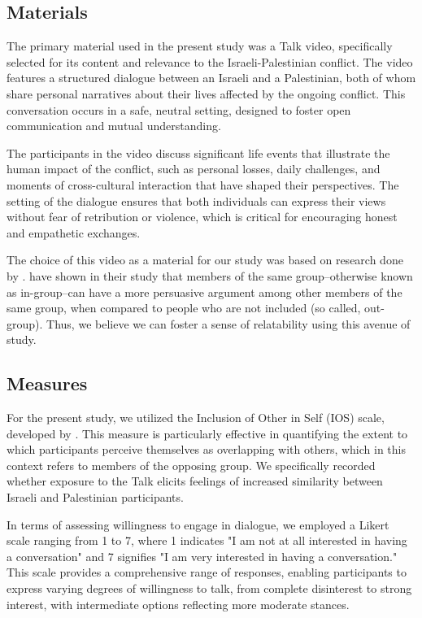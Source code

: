 \documentclass[stu,12pt,floatsintext]{apa7}
\begin{document}
\subsection{Materials}

The primary material used in the present study was a \textcite{tedvideo} Talk video, specifically selected for its content and relevance to the Israeli-Palestinian conflict. The video features a structured dialogue between an Israeli and a Palestinian, both of whom share personal narratives about their lives affected by the ongoing conflict. This conversation occurs in a safe, neutral setting, designed to foster open communication and mutual understanding.

The participants in the video discuss significant life events that illustrate the human impact of the conflict, such as personal losses, daily challenges, and moments of cross-cultural interaction that have shaped their perspectives. The setting of the dialogue ensures that both individuals can express their views without fear of retribution or violence, which is critical for encouraging honest and empathetic exchanges.

The choice of this video as a material for our study was based on research done by \textcite{sunstein2015wiser}. \textcite{sunstein2015wiser} have shown in their study that members of the same group--otherwise known as in-group--can have a more persuasive argument among other members of the same group, when compared to people who are not included (so called, out-group). Thus, we believe we can foster a sense of relatability using this avenue of study.

\subsection{Measures}

For the present study, we utilized the Inclusion of Other in Self (IOS) scale, developed by \textcite{aron1992inclusion}. This measure is particularly effective in quantifying the extent to which participants perceive themselves as overlapping with others, which in this context refers to members of the opposing group. We specifically recorded whether exposure to the \textcite{tedvideo} Talk elicits feelings of increased similarity between Israeli and Palestinian participants.

In terms of assessing willingness to engage in dialogue, we employed a Likert scale ranging from 1 to 7, where 1 indicates "I am not at all interested in having a conversation" and 7 signifies "I am very interested in having a conversation." This scale provides a comprehensive range of responses, enabling participants to express varying degrees of willingness to talk, from complete disinterest to strong interest, with intermediate options reflecting more moderate stances.
\end{document}
